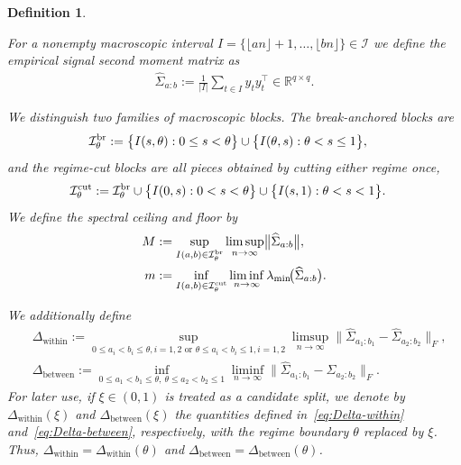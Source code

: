 \documentclass[10pt, letterpaper]{amsart}
\newtheorem{defn}[theorem]{Definition}
\def\min{{\rm min}}
\begin{document}
\begin{defn}\label{def_singal_and_noise}

For a nonempty macroscopic interval $ I= \{\lfloor a n\rfloor +1, \ldots, \lfloor b n \rfloor \}\in\mathcal{I}$ we define the empirical signal second moment matrix as
\begin{align}
   \widehat \Sigma_{a : b}
   := \frac{1}{|I|}\sum_{t \in I} y_t y_t^{\top} \in\mathbb R^{q\times q}.
\end{align}    

We distinguish two families of macroscopic blocks.  The break-anchored
blocks are
\begin{align}
\mathcal I_{\theta}^{\rm br}
:={}&
\bigl\{I(s,\theta):0\leq s<\theta\bigr\}
\cup
\bigl\{I(\theta,s):\theta<s\leq1\bigr\},
\end{align}
and the regime-cut blocks are all pieces obtained by cutting either regime once,
\begin{align}
\mathcal I_{\theta}^{\rm cut}
:={}&
\mathcal I_{\theta}^{\rm br}
\cup
\bigl\{I(0,s):0<s<\theta\bigr\}
\cup
\bigl\{I(s,1):\theta<s<1\bigr\}.
\end{align}
We define the spectral ceiling and floor by
\begin{align}\label{equ:def_M_m}
M
&:=
\sup_{I(a,b)\in\mathcal I_{\theta}^{\rm br}}
\limsup_{n\to\infty}\bigl\|\widehat\Sigma_{a:b}\bigr\|,
\\
m
&:=
\inf_{I(a,b)\in\mathcal I_{\theta}^{\rm cut}}
\liminf_{n\to\infty}
\lambda_{\min}\!\bigl(\widehat\Sigma_{a:b}\bigr).
\end{align}

We additionally define 
\begin{align}
  & \Delta_{\mathrm{within}}
  :=  \sup_{0\leq a_i <b_i \leq \theta, i =1,2 \text{ or } \theta \leq a_i < b_i \leq 1 , i =1,2}  \limsup_{n \to \infty}
    \| \widehat \Sigma_{a_1: b_1} - \widehat \Sigma_{a_2: b_2} \|_{F} , \label{eq:Delta-within} \\
  & \Delta_{\mathrm{between}}
  :=  \inf_{0\leq a_1 <b_1 \leq \theta, \  \theta \leq a_2 < b_2 \leq 1}  \liminf_{n \to \infty}
    \| \widehat \Sigma_{a_1: b_1} - \widehat \Sigma_{a_2 : b_2}  \|_{F} . \label{eq:Delta-between}
\end{align}
For later use, if $\xi\in(0,1)$ is treated as a candidate split, we denote by
$\Delta_{\mathrm{within}}(\xi)$ and $\Delta_{\mathrm{between}}(\xi)$
the quantities defined in~\eqref{eq:Delta-within} and~\eqref{eq:Delta-between},
respectively, with the regime boundary $\theta$ replaced by $\xi$. Thus,
$\Delta_{\mathrm{within}}=\Delta_{\mathrm{within}}(\theta)$ and
$\Delta_{\mathrm{between}}=\Delta_{\mathrm{between}}(\theta)$.

\end{defn}
\end{document}
